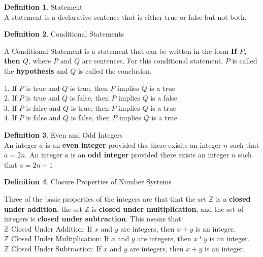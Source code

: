 \documentclass{book}
\theoremstyle{definition}
\newtheorem{definition}{Definition}[section]
\theoremstyle{remark}
\newcommand{\bb}[1]{\mathbb{#1}}
\begin{document}
\begin{definition}
Statement \\

A statement is a declarative sentence that is either true or false but not both. \\
\end{definition}

\begin{definition}
Conditional Statements

A Conditional Statement is a statement that can be written in the form {\bf If $P$, then $Q$}, where $P$ and $Q$ are sentences. For this conditional statement, $P$ is called the {\bf hypothesis} and $Q$ is called the conclusion. \\

\begin{minipage}{1\textwidth}
1. If $P$ is true and $Q$ is true, then $P$ implies $Q$ is a true \\
2. If $P$ is true and $Q$ is false, then $P$ implies $Q$ is a false \\
3. If $P$ is false and $Q$ is true, then $P$ implies $Q$ is a true \\
4. If $P$ is false and $Q$ is false, then $P$ implies $Q$ is a true \\
\end{minipage}
\end{definition}

\begin{definition}
Even and Odd Integers \\

An integer $a$ is an {\bf even integer} provided tha there exisits an integer $n$ such that $a = 2n$. An integer $a$ is an {\bf odd integer} provided there exists an integer $n$ such that $a = 2n + 1$
\end{definition}


\begin{definition}
Closure Properties of Number Systems

Three of the basic properties of the integers are that that the set $\bb{Z}$ is a {\bf closed under addition}, the set $\bb{Z}$ is {\bf closed under multiplication}, and the set of integers is {\bf closed under subtraction}. This means that: \\

$\bb{Z}$ Closed Under Addition: If $x$ and $y$ are integers, then $x+y$ is an integer. \\
 
$\bb{Z}$ Closed Under Multiplication: If $x$ and $y$ are integers, then $x*y$ is an integer. \\

$\bb{Z}$ Closed Under Subtraction: If $x$ and $y$ are integers, then $x+y$ is an integer. \\

\end{definition}
\end{document}
